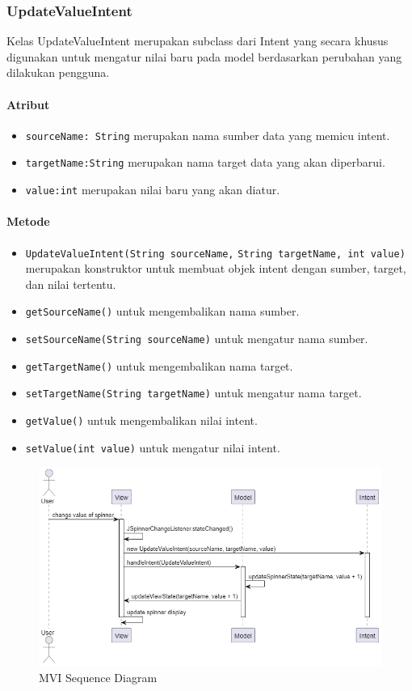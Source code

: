 \documentclass[conference]{IEEEtran}
\begin{document}
\subsubsection{UpdateValueIntent}
Kelas UpdateValueIntent merupakan subclass dari Intent yang secara khusus digunakan untuk mengatur nilai baru pada model berdasarkan perubahan yang dilakukan pengguna.
\paragraph{Atribut} 
\begin{itemize}
\item \verb |sourceName: String| merupakan nama sumber data yang memicu intent.
\item \verb |targetName:String| merupakan nama target data yang akan diperbarui.
\item \verb |value:int| merupakan nilai baru yang akan diatur.
\end{itemize}
\paragraph{Metode} 
\begin{itemize}
\item \verb |UpdateValueIntent(String sourceName,| \verb |String targetName, int value)| merupakan konstruktor untuk membuat objek intent dengan sumber, target, dan nilai tertentu.
\item \verb |getSourceName()| untuk mengembalikan nama sumber. 
\item \verb |setSourceName(String sourceName)| untuk mengatur nama sumber.
\item \verb |getTargetName()| untuk mengembalikan nama target.
\item \verb |setTargetName(String targetName)| untuk mengatur nama target.
\item \verb |getValue()| untuk mengembalikan nilai intent.
\item \verb |setValue(int value)| untuk mengatur nilai intent. \\
\end{itemize}

\begin{figure}[h]
    \centering
    \includegraphics[width=0.8\linewidth]{MVISequence.png}
    \caption{MVI Sequence Diagram}
    \label{fig:enter-label}
\end{figure}
\end{document}
